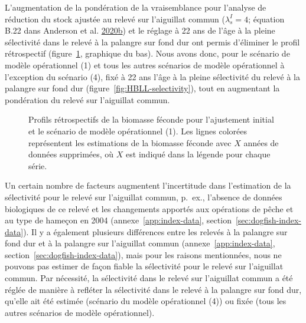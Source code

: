 \documentclass[french,11pt]{book}
\begin{document}
L'augmentation de la pondération de la vraisemblance pour l'analyse de réduction du stock ajustée au relevé sur l'aiguillat commun (\(\lambda^I_s = 4\); équation B.22 dans Anderson et al. \protect\hyperlink{ref-anderson2020gfmp}{2020}\protect\hyperlink{ref-anderson2020gfmp}{b}) et le réglage à 22 ans de l'âge à la pleine sélectivité dans le relevé à la palangre sur fond dur ont permis d'éliminer le profil rétrospectif (figure~\ref{fig:retro-initial}, graphique du bas). Nous avons donc, pour le scénario de modèle opérationnel (1) et tous les autres scénarios de modèle opérationnel à l'exception du scénario (4), fixé à 22 ans l'âge à la pleine sélectivité du relevé à la palangre sur fond dur (figure~\ref{fig:HBLL-selectivity}), tout en augmentant la pondération du relevé sur l'aiguillat commun.


\begin{figure}[htb]

{\centering {} 

}

\caption{Profils rétrospectifs de la biomasse féconde pour l'ajustement initial et le scénario de modèle opérationnel (1). Les lignes colorées représentent les estimations de la biomasse féconde avec \(X\) années de données supprimées, où \(X\) est indiqué dans la légende pour chaque série.}\label{fig:retro-initial}
\end{figure}
Un certain nombre de facteurs augmentent l'incertitude dans l'estimation de la sélectivité pour le relevé sur l'aiguillat commun, p.~ex., l'absence de données biologiques de ce relevé et les changements apportés aux opérations de pêche et au type de hameçon en 2004 (annexe~\ref{app:index-data}, section~\ref{sec:dogfish-index-data}). Il y a également plusieurs différences entre les relevés à la palangre sur fond dur et à la palangre sur l'aiguillat commun (annexe~\ref{app:index-data}, section~\ref{sec:dogfish-index-data}), mais pour les raisons mentionnées, nous ne pouvons pas estimer de façon fiable la sélectivité pour le relevé sur l'aiguillat commun. Par nécessité, la sélectivité dans le relevé sur l'aiguillat commun a été réglée de manière à refléter la sélectivité dans le relevé à la palangre sur fond dur, qu'elle ait été estimée (scénario du modèle opérationnel (4)) ou fixée (tous les autres scénarios de modèle opérationnel).
\end{document}

